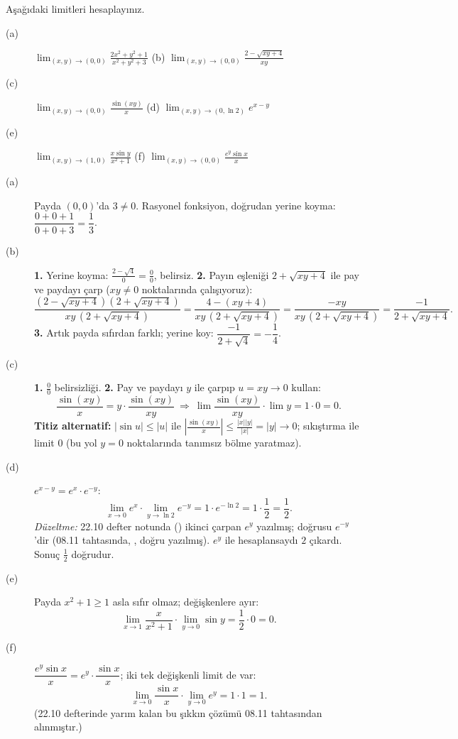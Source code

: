 \begin{soru}
Aşağıdaki limitleri hesaplayınız.
\begin{description}
  \item[(a)] $\displaystyle\lim_{(x,y)\to(0,0)}\frac{2x^2+y^2+1}{x^2+y^2+3}$ \qquad
  (b) $\displaystyle\lim_{(x,y)\to(0,0)}\frac{2-\sqrt{xy+4}}{xy}$
  \item[(c)] $\displaystyle\lim_{(x,y)\to(0,0)}\frac{\sin(xy)}{x}$ \qquad
  (d) $\displaystyle\lim_{(x,y)\to(0,\ln2)}e^{x-y}$
  \item[(e)] $\displaystyle\lim_{(x,y)\to(1,0)}\frac{x\sin y}{x^2+1}$ \qquad
  (f) $\displaystyle\lim_{(x,y)\to(0,0)}\frac{e^y\sin x}{x}$
\end{description}
\end{soru}
\begin{cevap}
\begin{description}
  \item[(a)] Payda $(0,0)$'da $3\neq0$. Rasyonel fonksiyon, doğrudan yerine koyma:
  $\dfrac{0+0+1}{0+0+3}=\dfrac13$.
  \item[(b)] \textbf{1.} Yerine koyma: $\frac{2-\sqrt4}{0}=\frac00$, belirsiz.
  \textbf{2.} Payın eşleniği $2+\sqrt{xy+4}$ ile pay ve paydayı çarp ($xy\neq0$ noktalarında çalışıyoruz):
  \[
  \frac{(2-\sqrt{xy+4})(2+\sqrt{xy+4})}{xy\,(2+\sqrt{xy+4})}=\frac{4-(xy+4)}{xy\,(2+\sqrt{xy+4})}
  =\frac{-xy}{xy\,(2+\sqrt{xy+4})}=\frac{-1}{2+\sqrt{xy+4}} .
  \]
  \textbf{3.} Artık payda sıfırdan farklı; yerine koy: $\dfrac{-1}{2+\sqrt4}=-\dfrac14$.
  \item[(c)] \textbf{1.} $\frac00$ belirsizliği. \textbf{2.} Pay ve paydayı $y$ ile çarpıp $u=xy\to0$ kullan:
  \[
  \frac{\sin(xy)}{x}=y\cdot\frac{\sin(xy)}{xy}\ \Rightarrow\
  \lim\frac{\sin(xy)}{xy}\cdot\lim y=1\cdot0=0 .
  \]
  \textbf{Titiz alternatif:} $|\sin u|\le|u|$ ile $\left|\frac{\sin(xy)}{x}\right|\le\frac{|x||y|}{|x|}=|y|\to0$;
  sıkıştırma ile limit $0$ (bu yol $y=0$ noktalarında tanımsız bölme yaratmaz).
  \item[(d)] $e^{x-y}=e^x\cdot e^{-y}$:
  \[
  \lim_{x\to0}e^x\cdot\lim_{y\to\ln2}e^{-y}=1\cdot e^{-\ln2}=1\cdot\frac12=\frac12 .
  \]
  \emph{Düzeltme:} 22.10 defter notunda () ikinci çarpan $e^{y}$ yazılmış; doğrusu
  $e^{-y}$'dir (08.11 tahtasında, \foto{IMG-20261108-WA0089}, doğru yazılmış). $e^y$ ile hesaplansaydı $2$ çıkardı.
  Sonuç $\tfrac12$ doğrudur.
  \item[(e)] Payda $x^2+1\ge1$ asla sıfır olmaz; değişkenlere ayır:
  \[
  \lim_{x\to1}\frac{x}{x^2+1}\cdot\lim_{y\to0}\sin y=\frac{1}{2}\cdot0=0 .
  \]
  \item[(f)] $\dfrac{e^y\sin x}{x}=e^y\cdot\dfrac{\sin x}{x}$; iki tek değişkenli limit de var:
  \[
  \lim_{x\to0}\frac{\sin x}{x}\cdot\lim_{y\to0}e^y=1\cdot1=1 .
  \]
  (22.10 defterinde yarım kalan bu şıkkın çözümü 08.11 tahtasından alınmıştır.)
\end{description}
\end{cevap}

